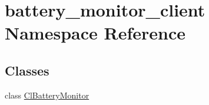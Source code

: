 \hypertarget{namespacebattery__monitor__client}{}\section{battery\+\_\+monitor\+\_\+client Namespace Reference}
\label{namespacebattery__monitor__client}
\subsection*{Classes}
\begin{DoxyCompactItemize}
\item 
class \hyperlink{classbattery__monitor__client_1_1ClBatteryMonitor}{Cl\+Battery\+Monitor}
\end{DoxyCompactItemize}
